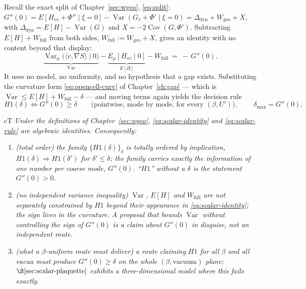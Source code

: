 Recall the exact split of Chapter~\ref{sec:wgeo}, \eqref{eq:split}:
$G''(0)=E[H_{vv}+\Phi''\mid\xi=0]-\operatorname{Var}(G_v+\Phi'\mid\xi=0)
=\Delta_{\mathrm{dyn}}+W_{\mathrm{geo}}+X$, with $\Delta_{\mathrm{dyn}}=E[H]-\operatorname{Var}(G)$
and $X=-2\operatorname{Cov}(G,\Phi')$. Subtracting $E[H]+W_{\mathrm{full}}$ from both sides,
$W_{\mathrm{full}}:=W_{\mathrm{geo}}+X$, gives an identity with no content beyond that display:
\begin{equation}
\underbrace{\operatorname{Var}_\mu\bigl(\langle v,\nabla S\rangle\mid0\bigr)}_{\operatorname{Var}}
-\underbrace{E_\mu[H_{vv}\mid0]}_{E[H]}-W_{\mathrm{full}}
\ =\ -\,G''(0).
\label{eq:scalar-identity}
\end{equation}
It uses no model, no uniformity, and no hypothesis that a gap exists. Substituting the curvature
form \eqref{eq:opencell-curv} of Chapter~\ref{ch:gap} --- which is
$\operatorname{Var}\le E[H]+W_{\mathrm{full}}-\delta$ --- and moving terms again yields the
decision rule
\begin{equation}
H1(\delta)\iff G''(0)\ge\delta
\qquad\text{(pointwise, mode by mode, for every }(\beta,U')\text{)},
\qquad
\boxed{\ \delta_{\max}=G''(0).\ }
\label{eq:scalar-rule}
\end{equation}

\begin{claimbox}{cT}
 \emph{Under the definitions of
Chapter~\ref{sec:wgeo}, \eqref{eq:scalar-identity} and \eqref{eq:scalar-rule} are algebraic
identities. Consequently:}
\begin{enumerate}
\item \emph{(total order)} \emph{the family $\{H1(\delta)\}_\delta$ is totally ordered by
  implication, $H1(\delta)\Rightarrow H1(\delta')$ for $\delta'\le\delta$; the family carries
  exactly the information of one number per coarse mode, $G''(0)$. ``$H1$'' without a $\delta$ is
  the statement $G''(0)>0$.}
\item \emph{(no independent variance inequality)} \emph{$\operatorname{Var}$, $E[H]$ and
  $W_{\mathrm{full}}$ are not separately constrained by $H1$ beyond their appearance in
  \eqref{eq:scalar-identity}; the sign lives in the curvature. A proposal that bounds
  $\operatorname{Var}$ without controlling the sign of $G''(0)$ is a claim about $G''(0)$ in
  disguise, not an independent route.}
\item \emph{(what a $\beta$-uniform route must deliver)} \emph{a route claiming $H1$ for all
  $\beta$ and all vacua must produce $G''(0)\ge\delta$ on the whole $(\beta,\text{vacuum})$
  plane; $\S\ref{sec:scalar-plaquette}$ exhibits a three-dimensional model where this fails
  exactly.}
\end{enumerate}
\LT{}
\end{claimbox}

